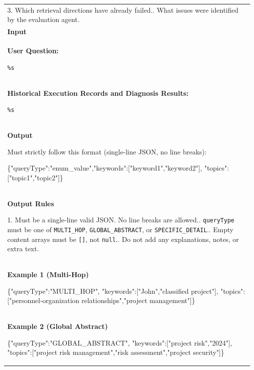 {\begin{longtable}{@{}p{}@{}}
3. Which retrieval directions have already failed.\newline
4. What issues were identified by the evaluation agent.
\\


\textbf{Input}
\\

\textbf{User Question:}\par
\texttt{\%s}
\\

\textbf{Historical Execution Records and Diagnosis Results:}\par
\texttt{\%s}
\\

\textbf{Output}\par

Must strictly follow this format (single-line JSON, no line breaks):\par

{\ttfamily
\{"queryType":"enum\_value","keywords":["keyword1","keyword2"],\newline
"topics":["topic1","topic2"]\}
}
\\


\textbf{Output Rules}\par

1. Must be a single-line valid JSON. No line breaks are allowed.\newline
2. \texttt{queryType} must be one of \texttt{MULTI\_HOP}, \texttt{GLOBAL\_ABSTRACT}, or \texttt{SPECIFIC\_DETAIL}.\newline
3. Empty content arrays must be \texttt{[]}, not \texttt{null}.\newline
4. Do not add any explanations, notes, or extra text.
\\


\textbf{Example 1 (Multi-Hop)}\par

{\ttfamily
\{"queryType":"MULTI\_HOP",\newline
"keywords":["John","classified project"],\newline
"topics":["personnel-organization relationships","project management"]\}
}
\\


\textbf{Example 2 (Global Abstract)}\par

{\ttfamily
\{"queryType":"GLOBAL\_ABSTRACT",\newline
"keywords":["project risk","2024"],\newline
"topics":["project risk management","risk assessment","project security"]\}
}
\\



\end{longtable}}
